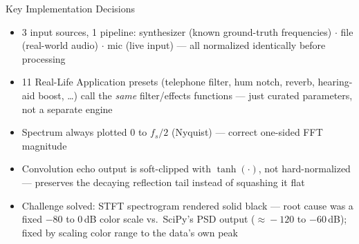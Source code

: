 \begin{frame}{Key Implementation Decisions}
  \begin{itemize}
    \item \alert{3 input sources, 1 pipeline}: synthesizer (known ground-truth frequencies) $\cdot$ file (real-world audio) $\cdot$ mic (live input) --- all normalized identically before processing
    \item \alert{11 Real-Life Application presets} (telephone filter, hum notch, reverb, hearing-aid boost, \ldots) call the \emph{same} filter/effects functions --- just curated parameters, not a separate engine
    \item Spectrum always plotted \alert{0 to $f_s/2$} (Nyquist) --- correct one-sided FFT magnitude
    \item Convolution echo output is \alert{soft-clipped with $\tanh(\cdot)$}, not hard-normalized --- preserves the decaying reflection tail instead of squashing it flat
    \item \alert{Challenge solved}: STFT spectrogram rendered solid black --- root cause was a fixed $-80$ to $0$\,dB color scale vs.\ SciPy's PSD output ($\approx\!-120$ to $-60$\,dB); fixed by scaling color range to the data's own peak
  \end{itemize}
\end{frame}
